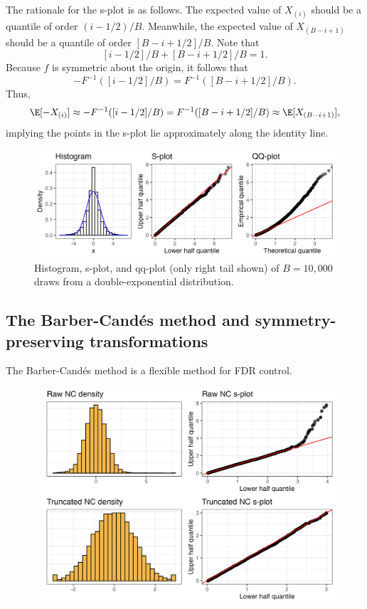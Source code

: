 \documentclass[12pt]{article}
\begin{document}
The rationale for the s-plot is as follows. The expected value of $X_{(i)}$ should be a quantile of order $(i - 1/2)/B$. Meanwhile, the expected value of $X_{(B-i+1)}$ should be a quantile of order $[B - i + 1/2]/B.$ Note that $$[i - 1/2]/B + [B - i + 1/2]/B = 1.$$ Because $f$ is symmetric about the origin, it follows that
$$-F^{-1}([i-1/2]/B ) = F^{-1}([B-i+1/2]/B).$$
Thus,
$$\E[-X_{(i)}] \approx -F^{-1}([i - 1/2]/B) = F^{-1}([B - i + 1/2]/B) \approx \E[X_{(B-i+1)}],$$ implying the points in the s-plot lie approximately along the identity line.
\begin{figure}
	\centering
	\includegraphics[width=1.0\linewidth]{../figs/s_plot}
	\caption{Histogram, s-plot, and qq-plot (only right tail shown) of $B=10,000$ draws from a double-exponential distribution.}
	\label{splot}
\end{figure}

\subsection{The Barber-Cand\'es method and symmetry-preserving transformations}

The Barber-Cand\'es method is a flexible method for FDR control. 

\begin{figure}
	\centering
	\includegraphics[width=1.0\linewidth]{../figs/bc_robustness_calibration}
	\caption{}
	\label{bcrobustnesscalibration}
\end{figure}


\printbibliography
\end{document}

